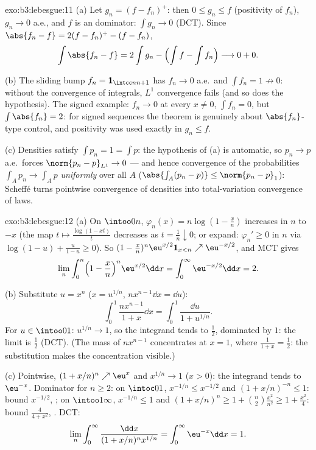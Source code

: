 \begin{solution}{exo:b3:lebesgue:11}
(a) Let $g_n = (f - f_n)^+$: then $0 \leq g_n \leq f$
(positivity of $f_n$), $g_n \to 0$ a.e., and $f$ is an
 dominator: $\int g_n \to 0$ (DCT). Since
$\abs{f_n - f} = 2(f - f_n)^+ - (f - f_n)$,
\[
\int\abs{f_n - f} = 2\int g_n - \Bigl(\int f - \int
f_n\Bigr) \longrightarrow 0 + 0 .
\]

(b) The sliding bump $f_n = \mathbf 1_{\intcc n{n+1}}$ has
$f_n \to 0$ a.e.\ and $\int f_n = 1 \not\to 0$: without the
convergence of integrals, $L^1$ convergence fails (and so
does the hypothesis). The signed example: $f_n \to 0$ at
every $x \neq 0$, $\int f_n = 0$, but $\int\abs{f_n} = 2$:
for signed sequences the theorem is genuinely about
$\abs{f_n}$-type control, and positivity was used exactly in
$g_n \leq f$.

(c) Densities satisfy $\int p_n = 1 = \int p$: the
hypothesis of (a) is automatic, so $p_n \to p$ a.e.\ forces
$\norm{p_n - p}_{L^1} \to 0$ --- and hence convergence of
the probabilities $\int_Ap_n \to \int_Ap$ \emph{uniformly}
over all  $A$ ($\abs{\int_A(p_n - p)} \leq
\norm{p_n - p}_1$): Scheff\'e turns pointwise convergence of
densities into total-variation convergence of laws.
\end{solution}

\begin{solution}{exo:b3:lebesgue:12}
(a) On $\intoo0n$, $\varphi_n(x) = n\log(1 - \frac xn)$
increases in $n$ to $-x$ (the map $t \mapsto
\frac{\log(1 - xt)}{t}$ decreases as $t = \frac1n
\downarrow 0$; or expand: $\varphi_{n}' \geq 0$ in $n$ via
$\log(1-u) + \frac{u}{1-u} \geq 0$). So $(1 -
\frac xn)^n\eu^{x/2}\mathbf 1_{x<n} \nearrow
\eu^{-x/2}$, and MCT gives
\[
\lim_n\int_0^n\Bigl(1 - \frac xn\Bigr)^n\eu^{x/2}\dd x =
\int_0^\infty\eu^{-x/2}\dd x = 2 .
\]

(b) Substitute $u = x^n$ ($x = u^{1/n}$, $n x^{n-1}\dd x =
\dd u$):
\[
\int_0^1\frac{nx^{n-1}}{1 + x}\dd x =
\int_0^1\frac{\dd u}{1 + u^{1/n}} .
\]
For $u \in \intoo01$: $u^{1/n} \to 1$, so the integrand
tends to $\frac12$, dominated by $1$: the limit is
$\frac12$ (DCT). (The mass of $nx^{n-1}$ concentrates at $x
= 1$, where $\frac1{1+x} = \frac12$: the substitution makes
the concentration visible.)

(c) Pointwise, $(1 + x/n)^n \nearrow \eu^x$ and $x^{1/n} \to
1$ ($x > 0$): the integrand tends to $\eu^{-x}$. Dominator
for $n \geq 2$: on $\intoc01$, $x^{-1/n} \leq x^{-1/2}$ and
$(1 + x/n)^{-n} \leq 1$: bound $x^{-1/2}$, ; on
$\intoo1\infty$, $x^{-1/n} \leq 1$ and $(1 + x/n)^n \geq 1 +
\binom n2\frac{x^2}{n^2} \geq 1 + \frac{x^2}4$: bound
$\frac{4}{4 + x^2}$, . DCT:
\[
\lim_n\int_0^\infty\frac{\dd x}{(1 + x/n)^nx^{1/n}} =
\int_0^\infty\eu^{-x}\dd x = 1 .
\]
\end{solution}


